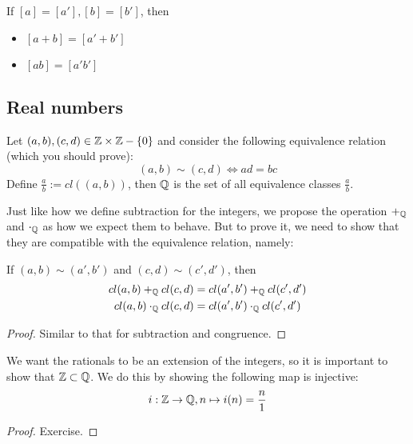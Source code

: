 \documentclass[11pt]{article}
\begin{document}

\begin{proposition}
  If \([a]=[a'], [b]=[b']\), then
  \begin{itemize}
    \item \([a+b] = [a'+b']\)
    \item \([ab] = [a'b']\)
  \end{itemize}
\end{proposition}


\subsection{Real numbers}

\begin{definition}
  Let \((a,b), (c,d) \in \mathbb{Z} \times \mathbb{Z} - \{0\}\) and consider the following equivalence relation (which you should prove):
  \begin{equation*}
    (a,b) \sim (c,d) \iff ad = bc
  \end{equation*}
  Define \(\frac{a}{b} := cl((a,b))\), then \(\mathbb{Q}\) is the set of all equivalence classes \(\frac{a}{b}\).
\end{definition}

Just like how we define subtraction for the integers, we propose the operation \(+_{\mathbb{Q}}\) and \(\cdot_{\mathbb{Q}}\) as how we expect them to behave. But to prove it, we need to show that they are compatible with the equivalence relation, namely:
\begin{proposition}
  If \((a,b) \sim (a',b')\) and \((c,d) \sim (c',d')\), then 
  \begin{align*}
    cl(a,b) +_{\mathbb{Q}} cl(c,d) &= cl(a',b') +_{\mathbb{Q}} cl(c',d') \\
    cl(a,b) \cdot_{\mathbb{Q}} cl(c,d) &= cl(a',b') \cdot_{\mathbb{Q}} cl(c',d')
  \end{align*}
\end{proposition}
\begin{proof}
  Similar to that for subtraction and congruence.
\end{proof}

We want the rationals to be an extension of the integers, so it is important to show that \(\mathbb{Z} \subset \mathbb{Q}\). We do this by showing the following map is injective:
\[i:\mathbb{Z} \to \mathbb{Q}, n \mapsto i(n) = \frac{n}{1}\]
\begin{proof}
  Exercise.
\end{proof}
\end{document}

